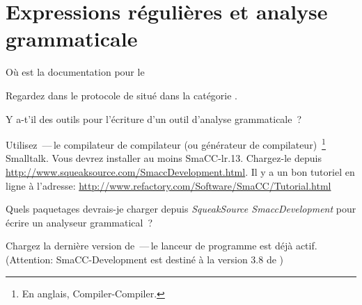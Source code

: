 \documentclass[a4paper,10pt,twoside]{book}
\begin{document}
\section{Expressions régulières et analyse grammaticale}


\begin{faq}
Où est la documentation pour le 
\end{faq}
\answer
Regardez dans le protocole  de  situé dans la catégorie .

\begin{faq}
Y a-t'il des outils pour l'écriture d'un outil d'analyse grammaticale~?
\end{faq}
\answer
Utilisez \,---\,le compilateur de compilateur (ou générateur de compilateur)~\footnote{En anglais, Compiler-Compiler.} Smalltalk.
Vous devrez installer au moins SmaCC-lr.13.
Chargez-le depuis \url{http://www.squeaksource.com/SmaccDevelopment.html}.
Il y a un bon tutoriel en ligne à l'adresse:
\url{http://www.refactory.com/Software/SmaCC/Tutorial.html}

\begin{faq}
Quels paquetages devrais-je charger depuis \emph{SqueakSource SmaccDevelopment} pour écrire un analyseur grammatical~?
\end{faq}
\answer
Chargez la dernière version de \,---\,le lanceur de programme est déjà actif.
(Attention: SmaCC-Development est destiné à la version 3.8 de \squeak)

\ifx\wholebook\relax\else
\end{document}
